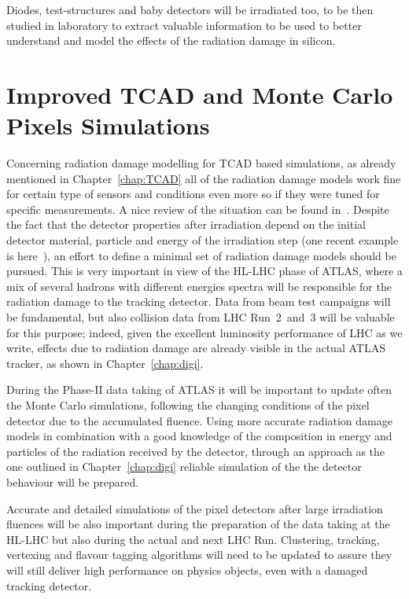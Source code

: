 Diodes, test-structures and baby detectors will be irradiated too, to be then studied in laboratory 
to extract valuable information to be used to better understand and model the effects of the radiation 
damage in silicon.

\section{Improved TCAD and Monte Carlo Pixels Simulations}
\label{sec:PerspTCAD}

Concerning radiation damage modelling for TCAD based simulations, as already mentioned in 
Chapter~\ref{chap:TCAD} all of the radiation damage models work fine for certain type of sensors and 
conditions even more so if they were tuned for specific measurements. 
A nice review of the situation can be found in~\cite{GregorVertex2016}. 
Despite the fact that the detector properties after irradiation depend on the initial detector material, particle  
and energy of the irradiation step (one recent example is here~\cite{Allport2016}), an effort to 
define a minimal set of radiation damage models should be pursued. This is very important in 
view of the HL-LHC phase of ATLAS, where a mix of several hadrons with different 
energies spectra will be responsible for the radiation damage to the tracking detector.
Data from beam test campaigns will be fundamental, but also collision data from LHC Run~2~and~3 
will be valuable for this purpose; indeed, given the excellent luminosity performance of LHC as we write, 
effects due to radiation damage are already visible in the actual ATLAS tracker, as 
shown in Chapter~\ref{chap:digi}.


During the Phase-II  data taking of ATLAS it will be important to update often  the  Monte Carlo 
simulations, following the changing conditions of the pixel detector due to the accumulated fluence. 
Using more accurate radiation damage models in combination with a good knowledge of  the composition in 
energy and particles of the radiation received by the detector, through an approach as the one outlined 
in Chapter~\ref{chap:digi} reliable simulation of the  the detector behaviour will be prepared.   

Accurate and detailed simulations of the pixel detectors after large irradiation fluences will be 
also important during the preparation of the data taking at the HL-LHC but also during the actual 
and next LHC Run. Clustering, tracking, vertexing and flavour tagging algorithms will need to be updated 
to assure they will still deliver high performance on physics objects, even with a damaged tracking 
detector. 


